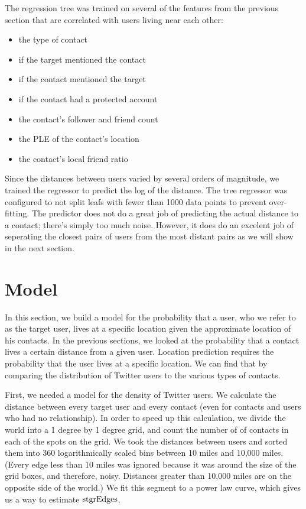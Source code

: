 The regression tree was trained on several of the features from the previous
section that are correlated with users living near each other:
\begin{itemize}
\item the type of contact
\item if the target mentioned the contact
\item if the contact mentioned the target
\item if the contact had a protected account
\item the contact's follower and friend count
\item the PLE of the contact's location
\item the contact's local friend ratio
\end{itemize}
%
Since the distances between users varied by several orders of magnitude, we
trained the regressor to predict the log of the distance.
%
The tree regressor was configured to not split leafs with fewer than 1000 data
points to prevent over-fitting.
%
The predictor does not do a great job of predicting the actual distance to a
contact; there's simply too much noise.
%
However, it does do an excelent job of seperating the closest pairs of users
from the most distant pairs as we will show in the next section.


\section{Model}
\label{sec:model}

In this section, we build a model for the probability that a user, who we refer
%
to as the target user, lives at a specific location given the approximate
location of his contacts.
%
In the previous sections, we looked at the probability that a contact lives a
certain distance from a given user.
%
Location prediction requires the probability that the user lives at a specific
location.
%
We can find that by comparing the distribution of Twitter users to the various
types of contacts.


First, we needed a model for the density of Twitter users.
%
We calculate the distance between every target user and every contact
(even for contacts and users who had no relationship).
%
In order to speed up this calculation, we divide the world into a \.1 degree
by \.1 degree grid, and count the number of of contacts in each of the spots
on the grid.
%
We took the distances between users and sorted them into 360 logarithmically
scaled bins between 10 miles and 10,000 miles.
%
(Every edge less than 10 miles was ignored because it was around the size of
the grid boxes, and therefore, noisy. Distances greater than 10,000 miles are
on the opposite side of the world.)
%
We fit this segment to a power law curve, which gives us a way to estimate
$\operatorname{stgrEdges}$.

